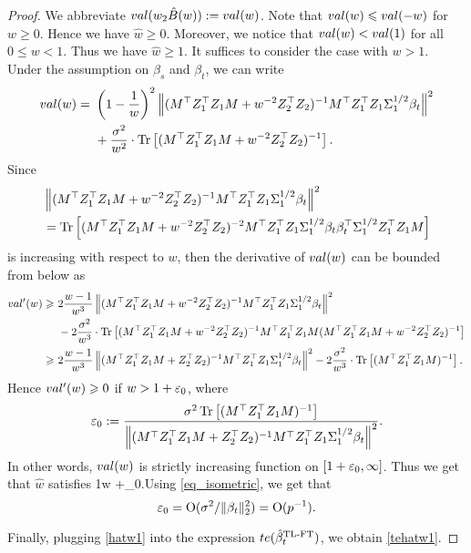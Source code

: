\begin{proof}
We abbreviate $val(w_2\hat{B}(w)):=val(w)$. Note that $val(w)\leqslant val(-w)$ for $w\ge 0$. Hence we have $\hat w\ge 0$. Moreover, we notice that $val (w) < val (1)$ for all $0\le w < 1$. Thus we have $\hat w\ge 1$. It suffices to consider the case with $w> 1$. Under the assumption on $\beta_s$ and $\beta_t$, we can write
\begin{align}
	val(w) =&~  \left( 1-\frac1w\right)^2 \left\|( M^\top Z_1^{\top}Z_1 M + w^{-2}Z_2^{\top}Z_2)^{-1} M^\top Z_1^{\top} Z_1 \Sigma_1^{1/2}\beta_t \right\|^2 \nonumber \\
			&~ + \frac{\sigma^2}{w^2} \cdot \operatorname{Tr}\left[( M^\top Z_1^{\top}Z_1 M + w^{-2}Z_2^{\top}Z_2)^{-1} \right]. \nonumber
\end{align}
Since
\begin{align*}
&\left\|( M^\top Z_1^{\top}Z_1 M + w^{-2}Z_2^{\top}Z_2)^{-1} M^\top Z_1^{\top} Z_1 \Sigma_1^{1/2}\beta_t \right\|^2 \\
&= \operatorname{Tr} \left[ ( M^\top Z_1^{\top}Z_1 M + w^{-2}Z_2^{\top}Z_2)^{-2}M^\top Z_1^{\top} Z_1 \Sigma_1^{1/2}\beta_t\beta_t^\top \Sigma_1^{1/2}Z_1^{\top} Z_1  M\right]
\end{align*}
is increasing with respect to $w$, then the derivative of $val(w)$ can be bounded from below as
\begin{align*}
val'(w) \geqslant &~ 2\frac{w-1}{w^3} \left\|( M^\top Z_1^{\top}Z_1 M + w^{-2}Z_2^{\top}Z_2)^{-1} M^\top Z_1^{\top} Z_1 \Sigma_1^{1/2}\beta_t \right\|^2   \\
			&~ - 2 \frac{\sigma^2}{w^3} \cdot \operatorname{Tr}\left[(M^\top Z_1^{\top}Z_1 M +w^{-2}  Z_2^{\top}Z_2)^{-1} M^\top Z_1^{\top}Z_1 M (M^\top Z_1^{\top}Z_1 M + w^{-2} Z_2^{\top}Z_2)^{-1}\right] \\
\geqslant &~ 2\frac{w-1}{w^3} \left\|( M^\top Z_1^{\top}Z_1 M +  Z_2^{\top}Z_2)^{-1} M^\top Z_1^{\top} Z_1 \Sigma_1^{1/2}\beta_t \right\|^2   - 2 \frac{\sigma^2}{w^3} \cdot \operatorname{Tr}\left[(M^\top Z_1^{\top}Z_1 M)^{-1}\right].
\end{align*}
Hence $val'(w)\geqslant 0$ if $w>1+ {\varepsilon}_0$, where
$${\varepsilon}_0:= \frac{\sigma^2  \operatorname{Tr}\left[(M^\top Z_1^{\top}Z_1 M)^{-1}\right] }{\left\|( M^\top Z_1^{\top}Z_1 M + Z_2^{\top}Z_2)^{-1} M^\top Z_1^{\top} Z_1 \Sigma_1^{1/2}\beta_t \right\|^2}.$$
In other words, $val(w)$ is strictly increasing function on $[1+{\varepsilon}_0,\infty]$. Thus we get that $\hat w$ satisfies
\be\label{hatw1}1\le w +\e_0.\ee Using \eqref{eq_isometric}, we get that
$${\varepsilon}_0=\operatorname{O}(\sigma^2/\|\beta_t\|_2^2)=\operatorname{O}(p^{-1}).$$

Finally, plugging \eqref{hatw1} into the expression $te(\hat{\beta}^{\text{TL-FT}}_{t}) $, we obtain \eqref{tehatw1}.
\end{proof}



